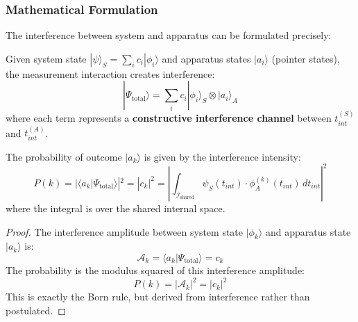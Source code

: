 \subsubsection{Mathematical Formulation}

The interference between system and apparatus can be formulated precisely:

\begin{definition}
Given system state $|\psi\rangle_S = \sum_i c_i |\phi_i\rangle$ and apparatus states $|a_i\rangle$ (pointer states), the measurement interaction creates interference:
\begin{equation}
    |\Psi_{\text{total}}\rangle = \sum_i c_i |\phi_i\rangle_S \otimes |a_i\rangle_A
\end{equation}
where each term represents a \textbf{constructive interference channel} between $t_{int}^{(S)}$ and $t_{int}^{(A)}$.
\end{definition}

\begin{theorem}
The probability of outcome $|a_k\rangle$ is given by the interference intensity:
\begin{equation}
    P(k) = |\langle a_k | \Psi_{\text{total}} \rangle|^2 = |c_k|^2 = \left| \int_{\mathcal{I}_{\text{shared}}} \psi_S(t_{int}) \cdot \phi_A^{(k)}(t_{int}) \, dt_{int} \right|^2
\end{equation}
where the integral is over the shared internal space.
\end{theorem}

\begin{proof}
The interference amplitude between system state $|\phi_k\rangle$ and apparatus state $|a_k\rangle$ is:
\begin{equation}
    \mathcal{A}_k = \langle a_k | \Psi_{\text{total}} \rangle = c_k
\end{equation}
The probability is the modulus squared of this interference amplitude:
\begin{equation}
    P(k) = |\mathcal{A}_k|^2 = |c_k|^2
\end{equation}
This is exactly the Born rule, but derived from interference rather than postulated.
\end{proof}

